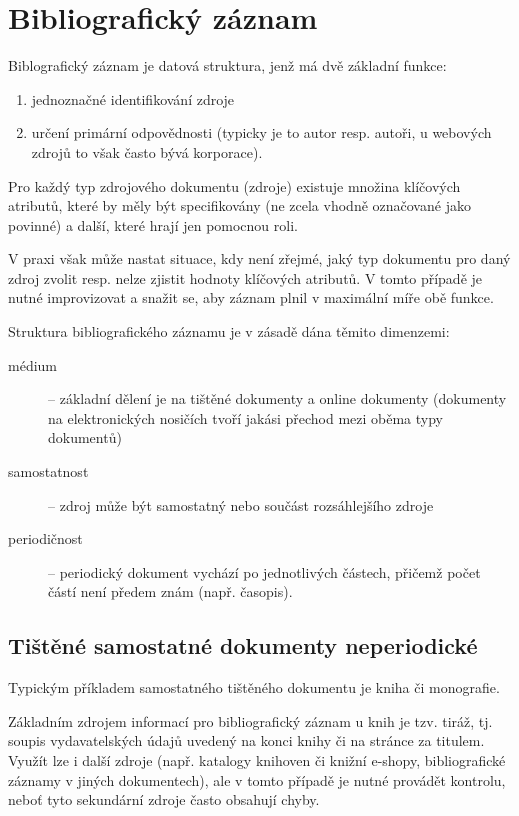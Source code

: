 \documentclass[male,czech,api_bc]{kitheses}
\begin{document}
\section{Bibliografický záznam}

Biblografický záznam je datová struktura, jenž má dvě základní funkce:

\begin{enumerate}
\item jednoznačné identifikování zdroje
\item určení primární odpovědnosti (typicky je to autor resp. autoři, u webových zdrojů to však často bývá korporace).
\end{enumerate}

Pro každý typ zdrojového dokumentu (zdroje) existuje množina klíčových atributů, které by měly být specifikovány (ne zcela vhodně označované jako povinné) a další, které hrají jen pomocnou roli.

V praxi však může nastat situace, kdy není zřejmé, jaký typ dokumentu pro daný zdroj zvolit resp.  nelze zjistit hodnoty klíčových atributů. V tomto případě je nutné improvizovat a snažit se, aby záznam plnil v maximální míře obě funkce.

Struktura bibliografického záznamu je v zásadě dána těmito dimenzemi:

\begin{description}
\item[médium] -- základní dělení je na tištěné dokumenty a online dokumenty (dokumenty na elektronických nosičích tvoří jakási přechod mezi oběma typy dokumentů)
\item[samostatnost] -- zdroj může být samostatný nebo součást rozsáhlejšího zdroje
\item[periodičnost] -- periodický dokument vychází po jednotlivých částech, přičemž počet částí není předem znám (např. časopis).  
\end{description}

\subsection{Tištěné samostatné dokumenty neperiodické}

Typickým příkladem samostatného tištěného dokumentu je kniha či monografie.

Základním zdrojem informací pro bibliografický záznam u knih je tzv. tiráž, tj. soupis vydavatelských údajů uvedený na konci knihy či na stránce za titulem. Využít lze i další zdroje (např. katalogy knihoven či knižní e-shopy, bibliografické záznamy v jiných dokumentech), ale v tomto případě je nutné provádět kontrolu, neboť tyto sekundární zdroje často obsahují chyby.
\end{document}
